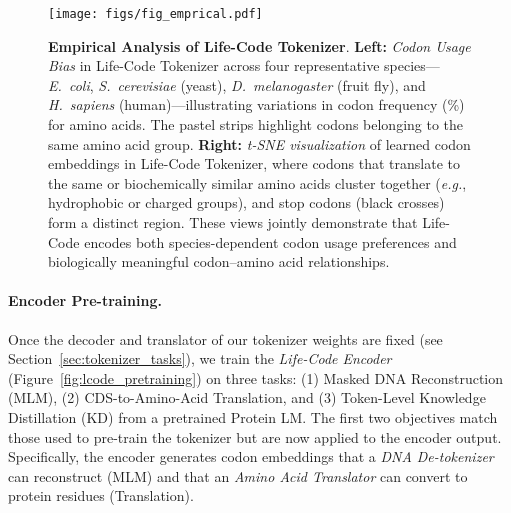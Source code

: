 \begin{figure*}[t!]
    \centering
    \texttt{[image: figs/fig\_emprical.pdf]}
    \vspace{-2.0em}
    \caption{\textbf{Empirical Analysis of Life-Code Tokenizer}.
    \textbf{Left:} \textit{Codon Usage Bias} in Life-Code Tokenizer across four representative species---\textit{E.~coli}, \textit{S.~cerevisiae} (yeast), \textit{D.~melanogaster} (fruit fly), and \textit{H.~sapiens} (human)---illustrating variations in codon frequency (\%) for amino acids. The pastel strips highlight codons belonging to the same amino acid group. 
    \textbf{Right:} \textit{t-SNE visualization} of learned codon embeddings in Life-Code Tokenizer, where codons that translate to the same or biochemically similar amino acids cluster together (\textit{e.g.}, hydrophobic or charged groups), and stop codons (black crosses) form a distinct region. These views jointly demonstrate that Life-Code encodes both species-dependent codon usage preferences and biologically meaningful codon--amino acid relationships.
    }
    \vspace{-1.0em}
    \label{fig:codon}
\end{figure*}

\vspace{-0.25em}
\paragraph{Encoder Pre-training.}
Once the decoder and translator of our tokenizer weights are fixed (see Section~\ref{sec:tokenizer_tasks}), we train the \emph{Life-Code Encoder} (Figure~\ref{fig:lcode_pretraining}) on three tasks: (1) Masked DNA Reconstruction (MLM), (2) CDS-to-Amino-Acid Translation, and (3) Token-Level Knowledge Distillation (KD) from a pretrained Protein LM. The first two objectives match those used to pre-train the tokenizer but are now applied to the encoder output. Specifically, the encoder generates codon embeddings that a \emph{DNA De-tokenizer} can reconstruct (MLM) and that an \emph{Amino Acid Translator} can convert to protein residues (Translation). 

